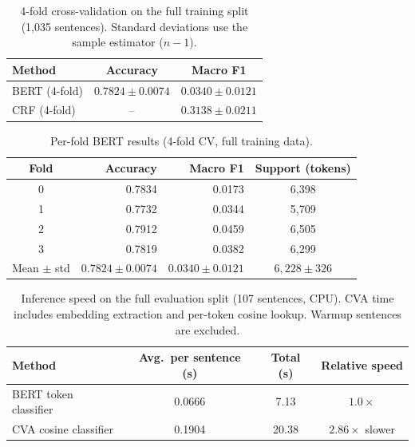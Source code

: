 \begin{table}[ht]
\centering
\caption{4-fold cross-validation on the full training split (1{,}035 sentences).
Standard deviations use the sample estimator ($n-1$).}
\label{tab:cv_results}
\begin{tabular}{lcc}
\toprule
Method & Accuracy & Macro F1 \\
\midrule
BERT (4-fold) & $0.7824 \pm 0.0074$ & $0.0340 \pm 0.0121$ \\
CRF (4-fold)  & --                   & $0.3138 \pm 0.0211$ \\
\bottomrule
\end{tabular}
\end{table}

\begin{table}[ht]
\centering
\caption{Per-fold BERT results (4-fold CV, full training data).}
\label{tab:bert_fold_details}
\begin{tabular}{crrc}
\toprule
Fold & Accuracy & Macro F1 & Support (tokens) \\
\midrule
0 & 0.7834 & 0.0173 & 6{,}398 \\
1 & 0.7732 & 0.0344 & 5{,}709 \\
2 & 0.7912 & 0.0459 & 6{,}505 \\
3 & 0.7819 & 0.0382 & 6{,}299 \\
\midrule
Mean $\pm$ std & $0.7824 \pm 0.0074$ & $0.0340 \pm 0.0121$ & $6{,}228 \pm 326$ \\
\bottomrule
\end{tabular}
\end{table}

\begin{table}[ht]
\centering
\caption{Inference speed on the full evaluation split (107 sentences, CPU).
CVA time includes embedding extraction and per-token cosine lookup.
Warmup sentences are excluded.}
\label{tab:inference_speed}
\begin{tabular}{lccc}
\toprule
Method & Avg.\ per sentence (s) & Total (s) & Relative speed \\
\midrule
BERT token classifier & 0.0666 & 7.13  & $1.0\times$ \\
CVA cosine classifier & 0.1904 & 20.38 & $2.86\times$ slower \\
\bottomrule
\end{tabular}
\end{table}

